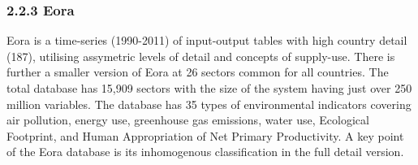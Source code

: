 \subsubsection{2.2.3 Eora}


Eora is a time-series (1990-2011) of input-output tables with high country detail (187), utilising assymetric levels of detail and concepts of supply-use. There is further a smaller version of Eora at 26 sectors common for all countries. The total database has 15,909 sectors with the size of the system having just over 250 million variables. The database has 35 types of environmental indicators covering air pollution, energy use, greenhouse gas emissions, water use, Ecological Footprint, and Human Appropriation of Net Primary Productivity. A key point of the Eora database is its inhomogenous classification in the full detail version.
